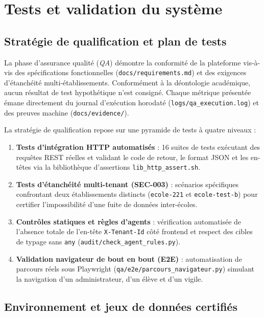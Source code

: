 \chapter{Tests et validation du système}

\section{Stratégie de qualification et plan de tests}

La phase d'assurance qualité (\emph{QA}) démontre la conformité de la plateforme vis-à-vis des spécifications fonctionnelles (\nolinkurl{docs/requirements.md}) et des exigences d'étanchéité multi-établissements. Conformément à la déontologie académique, aucun résultat de test hypothétique n'est consigné. Chaque métrique présentée émane directement du journal d'exécution horodaté (\nolinkurl{logs/qa_execution.log}) et des preuves machine (\nolinkurl{docs/evidence/}).

La stratégie de qualification repose sur une pyramide de tests à quatre niveaux :
\begin{enumerate}
    \item \textbf{Tests d'intégration HTTP automatisés} : 16 suites de tests exécutant des requêtes REST réelles et validant le code de retour, le format JSON et les en-têtes via la bibliothèque d'assertions \texttt{lib\_http\_assert.sh}.
    \item \textbf{Tests d'étanchéité multi-tenant (SEC-003)} : scénarios spécifiques confrontant deux établissements distincts (\texttt{ecole-221} et \texttt{ecole-test-b}) pour certifier l'impossibilité d'une fuite de données inter-écoles.
    \item \textbf{Contrôles statiques et règles d'agents} : vérification automatisée de l'absence totale de l'en-tête \texttt{X-Tenant-Id} côté frontend et respect des cibles de typage sans \texttt{any} (\texttt{audit/check\_agent\_rules.py}).
    \item \textbf{Validation navigateur de bout en bout (E2E)} : automatisation de parcours réels sous Playwright (\nolinkurl{qa/e2e/parcours_navigateur.py}) simulant la navigation d'un administrateur, d'un élève et d'un vigile.
\end{enumerate}

\section{Environnement et jeux de données certifiés}

